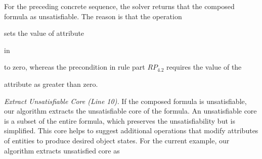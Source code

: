 For the preceding concrete sequence, the solver returns that the composed formula
as unsatisfiable. The reason is that the operation \subject{CreateOrder} sets
the value of attribute \subject{total} in \subject{Order} to zero, whereas the
precondition in rule part $RP_{4.2}$ requires the value of the \subject{total} 
attribute as greater than zero.

\textit{Extract Unsatisfiable Core (Line 10).} If the composed formula is unsatisfiable,
our algorithm extracts the unsatisfiable core of the formula. An unsatisfiable core 
is a subset of the entire formula, which preserves the unsatisfiability but is simplified.
This core helps to suggest additional operations that modify attributes of entities
to produce desired object states. For the current example, our algorithm extracts 
unsatisfied core as 



